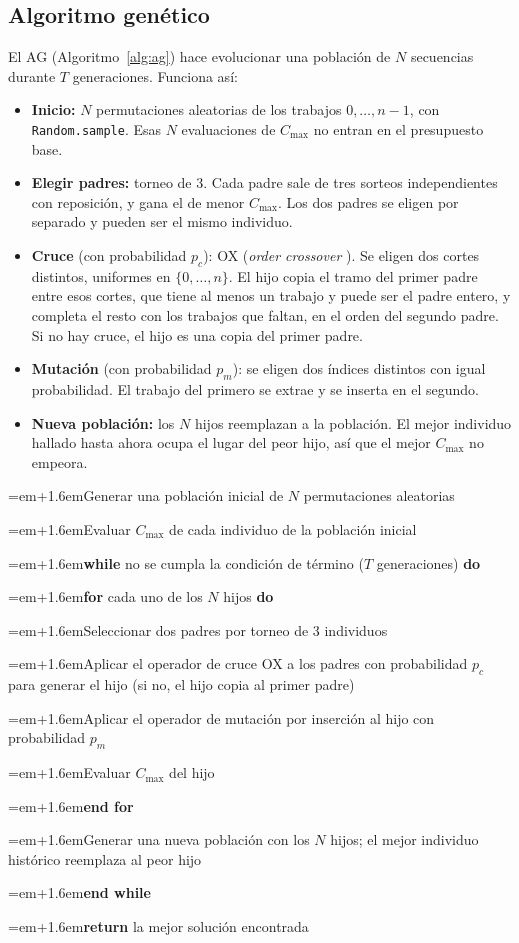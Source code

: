 \documentclass[journal]{IEEEtran}
\newcommand{\al}[2]{\par\noindent\hangindent=\dimexpr#1em+1.6em\relax\hangafter=1\hspace*{#1em}\li#2}
\newcounter{lin}\newcommand{\li}{\stepcounter{lin}\thelin:\ }
\begin{document}
\subsection{Algoritmo genético}
El AG (Algoritmo~\ref{alg:ag}) hace evolucionar una población de $N$ secuencias durante $T$ generaciones. Funciona así:
\begin{itemize}
  \item \textbf{Inicio:} $N$ permutaciones aleatorias de los trabajos $0,\ldots,n-1$, con \texttt{Random.sample}. Esas $N$ evaluaciones de $C_{\max}$ no entran en el presupuesto base.
  \item \textbf{Elegir padres:} torneo de 3. Cada padre sale de tres sorteos independientes con reposición, y gana el de menor $C_{\max}$. Los dos padres se eligen por separado y pueden ser el mismo individuo.
  \item \textbf{Cruce} (con probabilidad $p_c$): OX (\textit{order crossover} \cite{davis_applying_1985}). Se eligen dos cortes distintos, uniformes en $\{0,\ldots,n\}$. El hijo copia el tramo del primer padre entre esos cortes, que tiene al menos un trabajo y puede ser el padre entero, y completa el resto con los trabajos que faltan, en el orden del segundo padre. Si no hay cruce, el hijo es una copia del primer padre.
  \item \textbf{Mutación} (con probabilidad $p_m$): se eligen dos índices distintos con igual probabilidad. El trabajo del primero se extrae y se inserta en el segundo.
  \item \textbf{Nueva población:} los $N$ hijos reemplazan a la población. El mejor individuo hallado hasta ahora ocupa el lugar del peor hijo, así que el mejor $C_{\max}$ no empeora.
\end{itemize}

\begin{algoritmo}[H]
  \caption{Algoritmo genético (AG).}\label{alg:ag}
  \footnotesize\setcounter{lin}{0}
  \al{0}{Generar una población inicial de $N$ permutaciones aleatorias}
  \al{0}{Evaluar $C_{\max}$ de cada individuo de la población inicial}
  \al{0}{\textbf{while} no se cumpla la condición de término ($T$ generaciones) \textbf{do}}
  \al{1}{\textbf{for} cada uno de los $N$ hijos \textbf{do}}
  \al{2}{Seleccionar dos padres por torneo de 3 individuos}
  \al{2}{Aplicar el operador de cruce OX a los padres con probabilidad $p_c$ para generar el hijo (si no, el hijo copia al primer padre)}
  \al{2}{Aplicar el operador de mutación por inserción al hijo con probabilidad $p_m$}
  \al{2}{Evaluar $C_{\max}$ del hijo}
  \al{1}{\textbf{end for}}
  \al{1}{Generar una nueva población con los $N$ hijos; el mejor individuo histórico reemplaza al peor hijo}
  \al{0}{\textbf{end while}}
  \al{0}{\textbf{return} la mejor solución encontrada}
\end{algoritmo}
\end{document}
